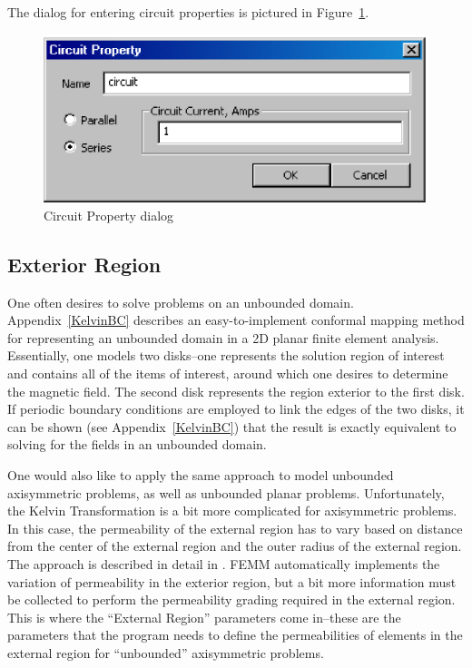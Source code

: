 \documentclass[12pt]{report}
\begin{document}
The dialog for entering circuit properties is pictured in
Figure~\ref{circprop}.
\begin{figure}[ht]
\centerline{\includegraphics{circprop.ps}}
\caption{Circuit Property dialog}
\label{circprop}
\end{figure}


\subsection{Exterior Region}

One often desires to solve problems on an unbounded domain.  Appendix~\ref{KelvinBC}
describes an easy-to-implement conformal mapping method for representing an unbounded
domain in a 2D planar finite element analysis.  Essentially, one models two disks--one
represents the solution region of interest and contains all of the items of interest,
around which one desires to determine the magnetic field.  The second disk represents
the region exterior to the first disk.  If periodic boundary conditions are employed to
link the edges of the two disks, it can be shown (see Appendix~\ref{KelvinBC}) that the
result is exactly equivalent to solving for the fields in an unbounded domain.

One would also like to apply the same approach to model unbounded axisymmetric problems,
as well as unbounded planar problems. Unfortunately, the Kelvin Transformation is a bit
more complicated for axisymmetric problems.  In this case, the permeability of the
external region has to vary based on distance from the center of the external region and
the outer radius of the external region.  The approach is described in detail in
\cite{LowFreeAxi}.  FEMM automatically implements the variation of permeability in the
exterior region, but a bit more information must be collected to perform the permeability
grading required in the external region.  This is where the ``External Region'' parameters
come in--these are the parameters that the program needs to define the permeabilities of
elements in the external region for ``unbounded'' axisymmetric problems.
\end{document}
